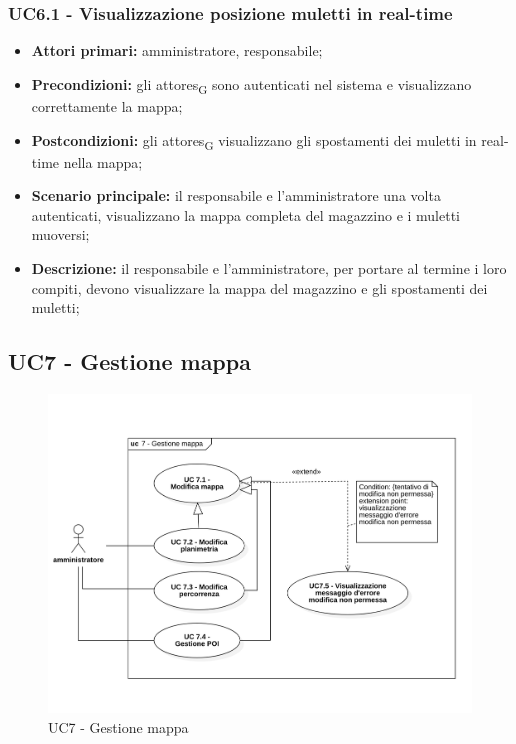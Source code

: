 \subsubsection{UC6.1 - Visualizzazione posizione muletti in real-time}
\begin{itemize}
	\item 	\textbf{Attori primari:} amministratore, responsabile;
	\item 	\textbf{Precondizioni:} gli \glspl{attore}\textsubscript{G} sono autenticati nel sistema e visualizzano correttamente la mappa;
	\item 	\textbf{Postcondizioni:} gli \glspl{attore}\textsubscript{G} visualizzano gli spostamenti dei muletti in real-time nella mappa;
	\item 	\textbf{Scenario principale:} il responsabile e l’amministratore una volta autenticati, visualizzano la mappa completa del magazzino e i muletti muoversi;
	\item 	\textbf{Descrizione:} il responsabile e l’amministratore, per portare al termine i loro compiti, devono visualizzare la mappa del magazzino e gli spostamenti dei muletti;
\end{itemize}

\subsection{UC7 - Gestione mappa}

\begin{figure}[H]
	\centering
	\includegraphics[scale=0.52]{res/images/uc7.png}
	\caption{UC7 - Gestione mappa}
\end{figure}

